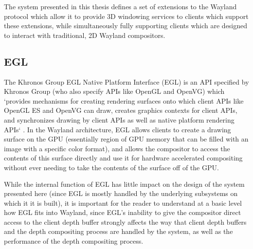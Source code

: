 The system presented in this thesis defines a set of extensions to the Wayland protocol which allow it to provide 3D windowing services to clients which support these extensions, while simultaneously fully supporting clients which are designed to interact with traditional, 2D Wayland compositors.

\subsection{EGL}
\label{sec:egl}

The Khronos Group EGL Native Platform Interface (EGL) \cite{egl} is an API specified by Khronos Group (who also specify APIs like OpenGL and OpenVG) which `provides mechanisms for creating rendering surfaces onto which client APIs like OpenGL ES and OpenVG can draw, creates graphics contexts for client APIs, and synchronizes drawing by client APIs as well as native platform rendering APIs` \cite{egl}. In the Wayland architecture, EGL allows clients to create a drawing surface on the GPU (essentially region of GPU memory that can be filled with an image with a specific color format), and allows the compositor to access the contents of this surface directly  and use it for hardware accelerated compositing without ever needing to take the contents of the surface off of the GPU. 

While the internal function of EGL has little impact on the design of the system presented here (since EGL is mostly handled by the underlying subsystems on which it it is built), it is important for the reader to understand at a basic level how EGL fits into Wayland, since EGL's inability to give the compositor direct access to the client depth buffer strongly affects the way that client depth buffers and the depth compositing process are handled by the system, as well as the performance of the depth compositing process.